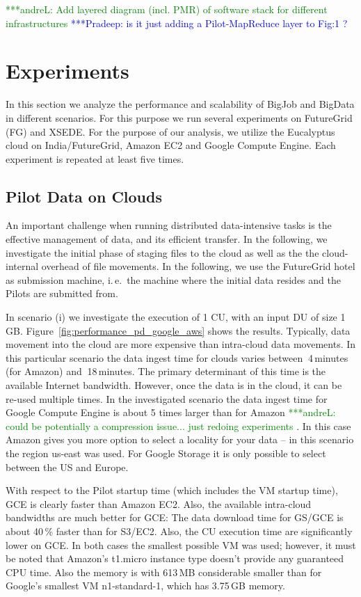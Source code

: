 \documentclass[times]{cpeauth}
\newcommand{\alnote}[1]{ {\textcolor{green} { ***andreL: #1 }}}
\newcommand{\pmnote}[1]{ {\textcolor{blue} { ***Pradeep: #1 }}}
\newcommand{\alnote}[1]{}
\newcommand{\pmnote}[1]{}
\newcommand{\pilot}{Pilot\xspace}
\newcommand{\pilots}{Pilots\xspace}
\newcommand{\du}{DU\xspace}
\newcommand{\cu}{CU\xspace}
\begin{document}
\alnote{Add layered diagram (incl. PMR) of software stack for different 
infrastructures}
\pmnote{ is it just adding a Pilot-MapReduce layer to Fig:1 ? }

\section{Experiments}

In this section we analyze the performance and scalability of BigJob and 
BigData in different scenarios. For this purpose we run several experiments on 
FutureGrid (FG) and XSEDE. For the purpose of our analysis, we utilize the 
Eucalyptus cloud on India/FutureGrid, Amazon EC2 and Google Compute Engine. 
Each experiment is repeated at least five times.

	
\subsection{Pilot Data on Clouds}

An important challenge when running distributed data-intensive tasks is the 
effective management of data, and its efficient transfer. In the following, we 
investigate the initial phase of staging files to the cloud as well as the 
the cloud-internal overhead of file movements.  In the following, we use the 
FutureGrid hotel as submission machine, i.\,e.\ the machine where the initial 
data resides and the \pilots are submitted from.

In scenario (i) we investigate the execution of 1 \cu, with an input \du of
size 1\,GB. Figure~\ref{fig:performance_pd_google_aws} shows the results.
Typically, data movement into the cloud are more expensive than intra-cloud
data movements. In this particular scenario the data ingest time for clouds
varies between $~$4\,minutes (for Amazon) and $~$18\,minutes. The primary
determinant of this time is the available Internet bandwidth. However, once
the data is in the cloud, it can be re-used multiple times. In the
investigated scenario the data ingest time for Google Compute Engine is about
5 times larger than for Amazon \alnote{could be potentially a compression
issue... just redoing experiments}. In this case Amazon gives you more option
to select a locality for your data -- in this scenario the region us-east was
used. For Google Storage it is only possible to select between the US and
Europe.

With respect to the \pilot startup time (which includes the VM startup time), 
GCE is clearly faster than Amazon EC2. Also, the available intra-cloud 
bandwidths are much better for GCE: The data download time for GS/GCE is about 
40\,\% faster than for S3/EC2. Also, the \cu execution time are significantly 
lower on GCE. In both cases the smallest possible VM was used; however, it 
must be noted that Amazon's t1.micro instance type doesn't provide any 
guaranteed CPU time. Also the memory is with 613\,MB considerable smaller than 
for Google's smallest VM n1-standard-1, which has 3.75\,GB memory.
\end{document}
